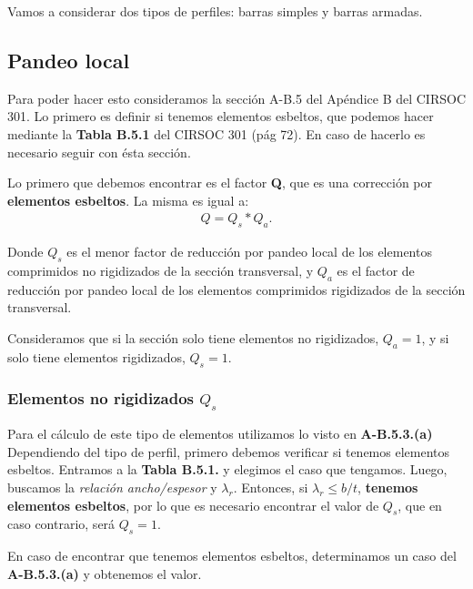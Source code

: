 \documentclass[../main.tex]{subfiles}
\begin{document}
Vamos a considerar dos tipos de perfiles: barras simples y barras armadas.

\subsection{Pandeo local}

Para poder hacer esto consideramos la sección A-B.5 del Apéndice B del CIRSOC
 301. Lo primero es definir si tenemos elementos esbeltos, que podemos hacer
 mediante la \textbf{Tabla B.5.1} del CIRSOC 301 (pág 72). En caso de hacerlo
 es necesario seguir con ésta sección.

Lo primero que debemos encontrar es el factor \textbf{Q}, que es una corrección
por \textbf{elementos esbeltos}. La misma es igual a:
\begin{align*}
  Q = Q_s * Q_a
.\end{align*}

Donde $Q_s$ es el menor factor de reducción por pandeo local de los elementos 
comprimidos no rigidizados de la sección transversal, y  $Q_a$ es el factor de
reducción por pandeo local de los elementos comprimidos rigidizados de la
sección transversal.

Consideramos que si la sección solo tiene elementos no rigidizados, $Q_a=1$, y
si solo tiene elementos rigidizados,  $Q_s=1$.

\subsubsection{Elementos no rigidizados $Q_s$}

Para el cálculo de este tipo de elementos utilizamos lo visto en \textbf{A-B.5.3.(a)}
Dependiendo del tipo de perfil, primero debemos verificar si tenemos elementos
esbeltos. Entramos a la \textbf{Tabla B.5.1.} y elegimos el caso que tengamos. 
Luego, buscamos la \textit{relación ancho/espesor} y $\lambda_r$. Entonces, si 
$\lambda_r \leq b/t$, \textbf{tenemos elementos esbeltos}, por lo que es
necesario encontrar el valor de $Q_s$, que en caso contrario, será  $Q_s=1$.

En caso de encontrar que tenemos elementos esbeltos, determinamos un caso del
\textbf{A-B.5.3.(a)} y obtenemos el valor.
\end{document}

